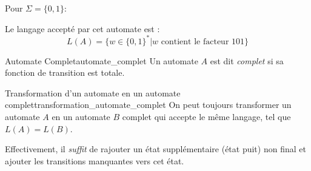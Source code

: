 \begin{example}
    Pour $\Sigma = \{0,1\} :$
    \begin{figure}[H]
        \centering
    \end{figure}
    Le langage accepté par cet automate est :
    \begin{equation*}
        L(A) = \{w\in \{0,1\}^* | w \text{ contient le facteur } 101\}
    \end{equation*}
\end{example}
\begin{definition}{Automate Complet}{automate_complet}
    Un automate $A$ est dit \textit{complet} si sa fonction de transition est totale.
\end{definition}
\begin{lemma}{Transformation d'un automate en un automate complet}{transformation_automate_complet}
    On peut toujours transformer un automate $A$ en un automate $B$ complet qui accepte le même langage, tel que $L(A) = L(B)$.  
\end{lemma}
\begin{remark}
    Effectivement, il \textit{suffit} de rajouter un état supplémentaire (état puit) non final et ajouter les transitions 
    manquantes vers cet état.
\end{remark}



